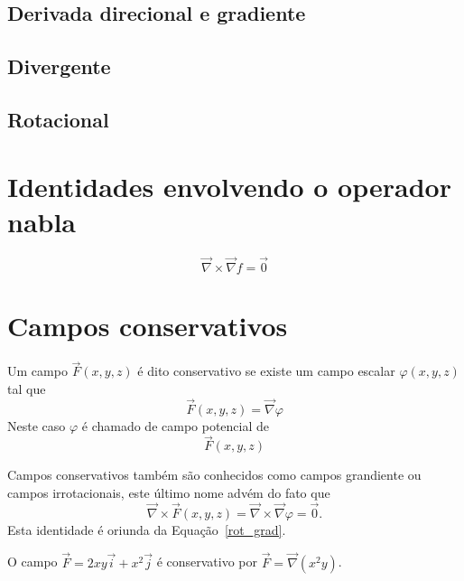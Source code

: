 \subsection{Derivada direcional e gradiente}
\subsection{Divergente}
\subsection{Rotacional}
\section{Identidades envolvendo o operador nabla}
\begin{equation}\label{rot_grad}
\vec{\nabla}\times\vec{\nabla}f=\vec{0}
\end{equation}


\section{Campos conservativos}
\begin{defn} \label{def_campo_conservativo}  Um campo $\vec{F}(x,y,z)$ é dito conservativo se existe um campo escalar $\varphi(x,y,z)$ tal que
$$\vec{F}(x,y,z) = \vec{\nabla}\varphi$$
Neste caso $\varphi$ é chamado de campo potencial de $$\vec{F}(x,y,z)$$
\end{defn}
\begin{obs} Campos conservativos também são conhecidos como campos grandiente ou campos irrotacionais, este último nome advém do fato que $$\vec{\nabla}\times\vec{F}(x,y,z) = \vec{\nabla}\times\vec{\nabla}\varphi=\vec{0}.$$
Esta identidade é oriunda da Equação~\ref{rot_grad}. 
 \end{obs}
\begin{ex} O campo $\vec{F}=2xy\vec{i}+x^2\vec{j}$ é conservativo por $\vec{F}=\vec{\nabla}\left(x^2y\right)$.
 \end{ex}

